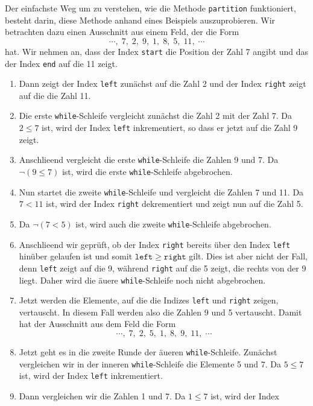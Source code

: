 Der einfachste Weg um zu verstehen, wie die Methode \texttt{partition} funktioniert,
besteht darin, diese Methode anhand eines Beispiels auszuprobieren.  Wir betrachten dazu 
einen Ausschnitt aus einem Feld, der die Form 
\[ \cdots,\; 7,\; 2,\; 9,\; 1,\; 8,\; 5,\; 11,\;\cdots \]
hat.  Wir nehmen an, dass der Index \texttt{start} die Position der Zahl 7 angibt und das
der Index \texttt{end} auf die 11 zeigt.  
\begin{enumerate}
\item Dann zeigt der Index \texttt{left} zun\"achst auf
      die Zahl 2 und der Index \texttt{right} zeigt auf die die Zahl 11.
\item Die erste \texttt{while}-Schleife vergleicht zun\"achst die Zahl 2 mit der Zahl 7.
      Da $2 \leq 7$ ist, wird der Index \texttt{left} inkrementiert, so dass er jetzt auf 
      die Zahl 9 zeigt.
\item Anschlie\3end vergleicht die  erste \texttt{while}-Schleife die Zahlen 9 und 7.
      Da $\neg(9 \leq 7)$ ist, wird die erste \texttt{while}-Schleife abgebrochen.
\item Nun startet die zweite \texttt{while}-Schleife und vergleicht die Zahlen 7 und 11.
      Da $7 < 11$ ist, wird der Index \texttt{right} dekrementiert und zeigt nun auf die
      Zahl 5.
\item Da $\neg (7 < 5)$ ist, wird auch die zweite \texttt{while}-Schleife abgebrochen.
\item Anschlie\3end wir gepr\"uft, ob der Index \texttt{right} bereits \"uber den Index
      \texttt{left} hin\"uber gelaufen ist und somit $\mathtt{left} \geq \mathtt{right}$
      gilt.   Dies ist aber nicht der Fall, denn \texttt{left} zeigt auf die 9,
      w\"ahrend \texttt{right} auf die 5 zeigt, die rechts von der 9 liegt.
      Daher wird die \"au\3ere \texttt{while}-Schleife noch nicht abgebrochen.
\item Jetzt werden die Elemente, auf die die Indizes \texttt{left} und \texttt{right}
      zeigen, vertauscht.  In diesem Fall werden also die Zahlen 9 und 5 vertauscht.
      Damit hat der Ausschnitt aus dem Feld die Form
      \[ \cdots,\; 7,\; 2,\; 5,\; 1,\; 8,\; 9,\; 11,\;\cdots \]
\item Jetzt geht es in die zweite Runde der \"au\3eren \texttt{while}-Schleife.
      Zun\"achst vergleichen wir in der inneren \texttt{while}-Schleife die Elemente
      5 und 7.  Da $5 \leq 7$ ist, wird der Index \texttt{left} inkrementiert.
\item Dann vergleichen wir die Zahlen 1 und 7.  Da $1 \leq 7$ ist, wird der Index

\end{enumerate}
